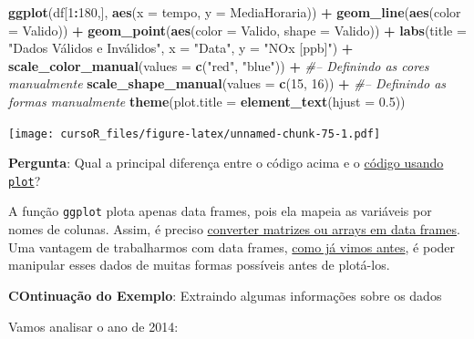 \documentclass[]{book}
\newenvironment{Shaded}{\begin{snugshade}}{\end{snugshade}}
\newcommand{\KeywordTok}[1]{\textcolor[rgb]{0.13,0.29,0.53}{\textbf{#1}}}
\newcommand{\DataTypeTok}[1]{\textcolor[rgb]{0.13,0.29,0.53}{#1}}
\newcommand{\DecValTok}[1]{\textcolor[rgb]{0.00,0.00,0.81}{#1}}
\newcommand{\FloatTok}[1]{\textcolor[rgb]{0.00,0.00,0.81}{#1}}
\newcommand{\StringTok}[1]{\textcolor[rgb]{0.31,0.60,0.02}{#1}}
\newcommand{\CommentTok}[1]{\textcolor[rgb]{0.56,0.35,0.01}{\textit{#1}}}
\newcommand{\OperatorTok}[1]{\textcolor[rgb]{0.81,0.36,0.00}{\textbf{#1}}}
\newcommand{\NormalTok}[1]{#1}
\begin{document}
\begin{Shaded}
\begin{Highlighting}[]
\KeywordTok{ggplot}\NormalTok{(df[}\DecValTok{1}\OperatorTok{:}\DecValTok{180}\NormalTok{,], }\KeywordTok{aes}\NormalTok{(}\DataTypeTok{x =}\NormalTok{ tempo, }\DataTypeTok{y =}\NormalTok{ MediaHoraria)) }\OperatorTok{+}\StringTok{ }
\StringTok{  }\KeywordTok{geom_line}\NormalTok{(}\KeywordTok{aes}\NormalTok{(}\DataTypeTok{color =}\NormalTok{ Valido)) }\OperatorTok{+}
\StringTok{  }\KeywordTok{geom_point}\NormalTok{(}\KeywordTok{aes}\NormalTok{(}\DataTypeTok{color =}\NormalTok{ Valido, }\DataTypeTok{shape =}\NormalTok{ Valido)) }\OperatorTok{+}
\StringTok{  }\KeywordTok{labs}\NormalTok{(}\DataTypeTok{title =} \StringTok{"Dados Válidos e Inválidos"}\NormalTok{, }\DataTypeTok{x =} \StringTok{"Data"}\NormalTok{, }\DataTypeTok{y =} \StringTok{"NOx [ppb]"}\NormalTok{) }\OperatorTok{+}
\StringTok{  }\KeywordTok{scale_color_manual}\NormalTok{(}\DataTypeTok{values =} \KeywordTok{c}\NormalTok{(}\StringTok{"red"}\NormalTok{, }\StringTok{"blue"}\NormalTok{)) }\OperatorTok{+}\StringTok{ }\CommentTok{#-- Definindo as cores manualmente}
\StringTok{  }\KeywordTok{scale_shape_manual}\NormalTok{(}\DataTypeTok{values =} \KeywordTok{c}\NormalTok{(}\DecValTok{15}\NormalTok{, }\DecValTok{16}\NormalTok{)) }\OperatorTok{+}\StringTok{ }\CommentTok{#-- Definindo as formas manualmente}
\StringTok{  }\KeywordTok{theme}\NormalTok{(}\DataTypeTok{plot.title =} \KeywordTok{element_text}\NormalTok{(}\DataTypeTok{hjust =} \FloatTok{0.5}\NormalTok{))}
\end{Highlighting}
\end{Shaded}

\texttt{[image: cursoR\_files/figure-latex/unnamed-chunk-75-1.pdf]}

\textbf{Pergunta}: Qual a principal diferença entre o código acima e o
\protect\hyperlink{plot_base}{código usando \texttt{plot}}?

A função \texttt{ggplot} plota apenas data frames, pois ela mapeia as
variáveis por nomes de colunas. Assim, é preciso
\protect\hyperlink{convert_df}{converter matrizes ou arrays em data
frames}.\\
Uma vantagem de trabalharmos com data frames,
\protect\hyperlink{processing_dfs}{como já vimos antes}, é poder
manipular esses dados de muitas formas possíveis antes de plotá-los.

\textbf{COntinuação do Exemplo}: Extraindo algumas informações sobre os
dados

Vamos analisar o ano de 2014:
\end{document}
